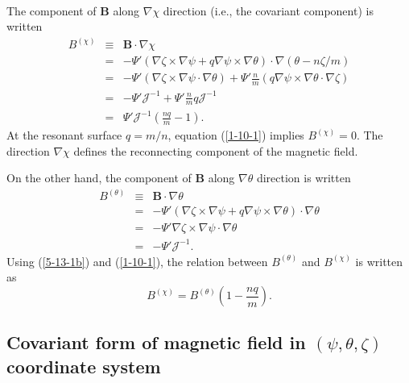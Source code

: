 \documentclass{article}
\begin{document}
\

The component of $\mathbf{B}$ along $\nabla \chi$ direction (i.e., the
covariant component) is written
\begin{eqnarray}
  B^{(\chi)} & \equiv & \mathbf{B} \cdot \nabla \chi \nonumber\\
  & = & - \Psi' (\nabla \zeta \times \nabla \psi + q \nabla \psi \times
  \nabla \theta) \cdot \nabla (\theta - n \zeta / m) \nonumber\\
  & = & - \Psi' (\nabla \zeta \times \nabla \psi \cdot \nabla \theta) + \Psi'
  \frac{n}{m} (q \nabla \psi \times \nabla \theta \cdot \nabla \zeta)
  \nonumber\\
  & = & - \Psi' \mathcal{J}^{- 1} + \Psi' \frac{n}{m} q\mathcal{J}^{- 1}
  \nonumber\\
  & = & \Psi' \mathcal{J}^{- 1} \left( \frac{n q}{m} - 1 \right) . 
  \label{1-10-1}
\end{eqnarray}
At the resonant surface $q = m / n$, equation (\ref{1-10-1}) implies
$B^{(\chi)} = 0$. The direction $\nabla \chi$ defines the reconnecting
component of the magnetic field.

On the other hand, the component of $\mathbf{B}$ along $\nabla \theta$
direction is written
\begin{eqnarray}
  B^{(\theta)} & \equiv & \mathbf{B} \cdot \nabla \theta \nonumber\\
  & = & - \Psi' (\nabla \zeta \times \nabla \psi + q \nabla \psi \times
  \nabla \theta) \cdot \nabla \theta \nonumber\\
  & = & - \Psi' \nabla \zeta \times \nabla \psi \cdot \nabla \theta
  \nonumber\\
  & = & - \Psi' \mathcal{J}^{- 1} .  \label{5-13-1b}
\end{eqnarray}
Using (\ref{5-13-1b}) and (\ref{1-10-1}), the relation between $B^{(\theta)}$
and $B^{(\chi)}$ is written as
\begin{equation}
  B^{(\chi)} = B^{(\theta)} \left( 1 - \frac{n q}{m} \right) .
\end{equation}


\subsection{Covariant form of magnetic field in $(\psi, \theta, \zeta)$
coordinate system}
\end{document}
